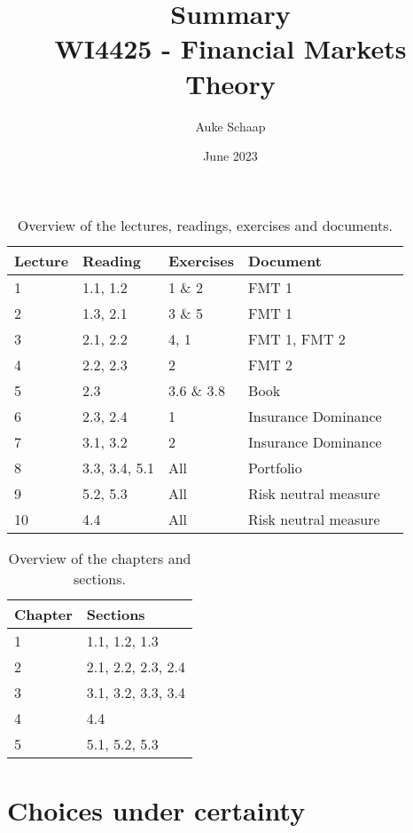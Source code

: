 \documentclass[twoside, titlepage]{article}
\title{%
    Summary \\
    \large WI4425 - Financial Markets Theory
}
\author{Auke Schaap}
\date{June 2023}
\begin{document}
\maketitle

\newpage

\thispagestyle{empty}
\begin{table}
    \centering
    \begin{tabular}{l|llll}
    Lecture &  Reading  &       Exercises & Document \\
    \hline
    1 &        1.1, 1.2 &       1 \& 2 & FMT 1 \\
    2 &        1.3, 2.1 &       3 \& 5 & FMT 1 \\
    3 &        2.1, 2.2 &       4, 1 & FMT 1, FMT 2 \\
    4 &        2.2, 2.3 &       2 & FMT 2 \\
    5 &        2.3 &            3.6 \& 3.8 & Book \\
    6 &        2.3, 2.4 &       1 & Insurance Dominance \\
    7 &        3.1, 3.2 &       2 & Insurance Dominance \\
    8 &        3.3, 3.4, 5.1 &  All & Portfolio \\
    9 &        5.2, 5.3 &       All & Risk neutral measure \\
    10&        4.4 &            All & Risk neutral measure
    \end{tabular}
    \caption{Overview of the lectures, readings, exercises and documents.}
\end{table}

\begin{table}
    \centering
    \begin{tabular}{l|l}
    Chapter & Sections \\
    \hline
    1 & 1.1, 1.2, 1.3 \\
    2 & 2.1, 2.2, 2.3, 2.4 \\
    3 & 3.1, 3.2, 3.3, 3.4 \\
    4 & 4.4 \\
    5 & 5.1, 5.2, 5.3
    \end{tabular}
    \caption{Overview of the chapters and sections.}
\end{table}

\clearpage

\thispagestyle{empty}
\tableofcontents
\clearpage

\section{Choices under certainty}
\end{document}

